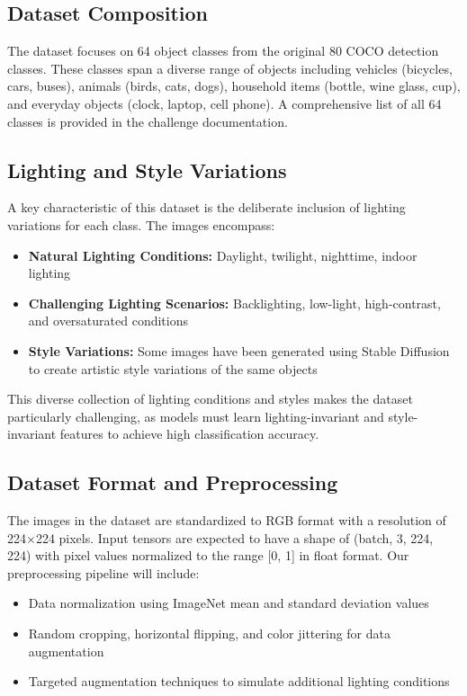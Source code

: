 \documentclass[11pt, oneside]{article}   	%
\begin{document}
\subsection*{Dataset Composition}

The dataset focuses on 64 object classes from the original 80 COCO detection classes. These classes span a diverse range of objects including vehicles (bicycles, cars, buses), animals (birds, cats, dogs), household items (bottle, wine glass, cup), and everyday objects (clock, laptop, cell phone). A comprehensive list of all 64 classes is provided in the challenge documentation.

\subsection*{Lighting and Style Variations}

A key characteristic of this dataset is the deliberate inclusion of lighting variations for each class. The images encompass:

\begin{itemize}
	\item \textbf{Natural Lighting Conditions:} Daylight, twilight, nighttime, indoor lighting
	\item \textbf{Challenging Lighting Scenarios:} Backlighting, low-light, high-contrast, and oversaturated conditions
	\item \textbf{Style Variations:} Some images have been generated using Stable Diffusion to create artistic style variations of the same objects
\end{itemize}

This diverse collection of lighting conditions and styles makes the dataset particularly challenging, as models must learn lighting-invariant and style-invariant features to achieve high classification accuracy.

\subsection*{Dataset Format and Preprocessing}

The images in the dataset are standardized to RGB format with a resolution of 224×224 pixels. Input tensors are expected to have a shape of (batch, 3, 224, 224) with pixel values normalized to the range [0, 1] in float format. Our preprocessing pipeline will include:

\begin{itemize}
	\item Data normalization using ImageNet mean and standard deviation values
	\item Random cropping, horizontal flipping, and color jittering for data augmentation
	\item Targeted augmentation techniques to simulate additional lighting conditions
\end{itemize}
\end{document}
